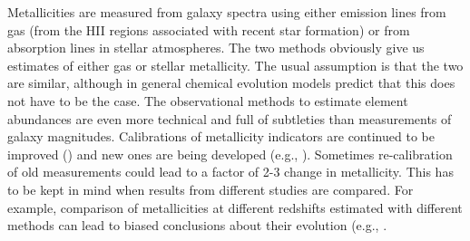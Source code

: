 Metallicities are measured from galaxy spectra using either emission lines from gas (from the HII regions associated with recent star formation) or from absorption lines in stellar atmospheres. The two methods obviously give us estimates of either gas or stellar metallicity. The usual assumption is that the two are similar, although in general chemical evolution models predict that this does not have to be the case. The observational methods to estimate element abundances are even more technical and full of subtleties than measurements of galaxy magnitudes. Calibrations of metallicity indicators are continued to be improved (\href{http://adsabs.harvard.edu/abs/2008ApJ...681.1183K}{\citealt{kewley_ellison08}}) and new ones are being developed (e.g., \href{http://adsabs.harvard.edu/abs/2010ApJS..191..352K}{\citealt{kirby_etal10}}). Sometimes re-calibration of old measurements could lead to a factor of 2-3 change in metallicity. This has to be kept in mind when results from different studies are compared. For example, comparison of metallicities at different redshifts estimated with different methods can lead to biased conclusions about their evolution (e.g., \href{http://www.aanda.org/component/article?access=bibcode&bibcode=&bibcode=2008A%2526A...488..463MFUL}{\citealt{maiolino_etal08}}.

